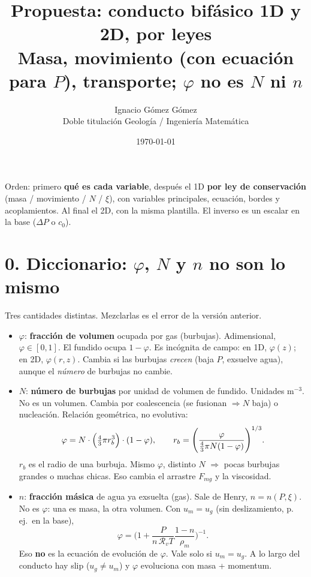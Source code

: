 \documentclass[11pt,a4paper]{article}
\title{\vspace{-1.2cm}
\textbf{Propuesta: conducto bifásico 1D y 2D, por leyes}\\[0.3em]
\large Masa, movimiento (con ecuación para $P$), transporte;
$\varphi$ no es $N$ ni $n$}
\author{Ignacio Gómez Gómez\\[0.1em]
{\small Doble titulación Geología / Ingeniería Matemática}}
\date{\today}
\newcommand{\Rv}{\mathcal{R}_v}
\begin{document}
\maketitle
\vspace{-0.85cm}

\noindent
Orden: primero \textbf{qué es cada variable}, después el 1D
\textbf{por ley de conservación} (masa / movimiento / $N$ /
$\xi$), con variables principales, ecuación, bordes y
acoplamientos. Al final el 2D, con la misma plantilla.
El inverso es un escalar en la base ($\Delta P$ o $c_0$).

\section*{0. Diccionario: $\varphi$, $N$ y $n$ no son lo mismo}

Tres cantidades distintas. Mezclarlas es el error de la
versión anterior.

\begin{itemize}
\item $\varphi$: \textbf{fracción de volumen} ocupada por gas
  (burbujas). Adimensional, $\varphi\in[0,1]$. El fundido ocupa
  $1-\varphi$. Es incógnita de campo: en 1D, $\varphi(z)$; en
  2D, $\varphi(r,z)$. Cambia si las burbujas \emph{crecen}
  (baja $P$, exsuelve agua), aunque el \emph{número} de
  burbujas no cambie.
\item $N$: \textbf{número de burbujas} por unidad de volumen
  de fundido. Unidades $\mathrm{m^{-3}}$. No es un volumen.
  Cambia por coalescencia (se fusionan $\Rightarrow N$ baja)
  o nucleación. Relación geométrica, no evolutiva:
  \begin{equation}
  \label{eq:rb}
  \varphi
  =N\cdot\Bigl(\tfrac43\pi r_b^3\Bigr)\cdot(1-\varphi),
  \qquad
  r_b
  =\Biggl(\frac{\varphi}{\tfrac43\pi N(1-\varphi)}\Biggr)^{1/3}.
  \end{equation}
  $r_b$ es el radio de una burbuja. Mismo $\varphi$, distinto
  $N$ $\Rightarrow$ pocas burbujas grandes o muchas chicas.
  Eso cambia el arrastre $F_{mg}$ y la viscosidad.
\item $n$: \textbf{fracción másica} de agua ya exsuelta (gas).
  Sale de Henry, $n=n(P,\xi)$. No es $\varphi$: una es masa,
  la otra volumen. Con $u_m=u_g$ (sin deslizamiento, p.\,ej.\
  en la base),
  \begin{equation}
  \label{eq:phi-noslip}
  \varphi
  =\Biggl(1+\frac{P}{n\,\Rv T}\frac{1-n}{\rho_m}\Biggr)^{-1}.
  \end{equation}
  Eso \textbf{no} es la ecuación de evolución de $\varphi$.
  Vale solo si $u_m=u_g$. A lo largo del conducto hay slip
  ($u_g\neq u_m$) y $\varphi$ evoluciona con masa + momentum.
\end{itemize}
\end{document}
